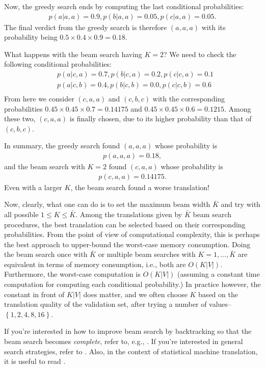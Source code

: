 \documentclass{report}
\begin{document}
Now, the greedy search ends by computing the last conditional probabilities:
\begin{align*}
    p(a|a,a) = 0.9, p(b|a,a) = 0.05, p(c|a,a) = 0.05.
\end{align*}
The final verdict from the greedy search is therefore $(a,a,a)$ with its
probability being $0.5 \times 0.4 \times 0.9 = 0.18$.

What happens with the beam search having $K=2$? We need to check the following
conditional probabilities:
\begin{align*}
    &p(a|c,a) = 0.7, p(b|c,a) = 0.2, p(c|c,a) =0.1 \\
    &p(a|c,b) = 0.4, p(b|c,b) = 0.0, p(c|c,b) =0.6 \\
\end{align*}
From here we consider $(c,a,a)$ and $(c,b,c)$ with the corresponding
probabilities $0.45 \times 0.45 \times 0.7=0.14175$ and $0.45 \times 0.45 \times
0.6 = 0.1215$. Among these two, $(c,a,a)$ is finally chosen, due to its higher
probability than that of $(c,b,c)$.

In summary, the greedy search found $(a,a,a)$ whose probability is
\begin{align*}
    p(a,a,a) = 0.18,
\end{align*}
and the beam search with $K=2$ found $(c,a,a)$ whose probability is
\begin{align*}
    p(c,a,a) = 0.14175.
\end{align*}
Even with a larger $K$, the beam search found a worse translation!

Now, clearly, what one can do is to set the maximum beam width $\bar{K}$ and try
with all possible $1 \leq K \leq \bar{K}$. Among the translations given by
$\bar{K}$ beam search procedures, the best translation can be selected based on
their corresponding probabilities. From the point of view of computational
complexity, this is perhaps the best approach to upper-bound the worst-case
memory consumption. Doing the beam search once with $\bar{K}$ or multiple beam
searches with $K=1,\ldots,\bar{K}$ are equivalent in terms of memory
consumption, i.e., both are $O(K|V|)$. Furthermore, the worst-case computation
is $O(K|V|)$ (assuming a constant time computation for computing each
conditional probability.) In practice however, the constant in front of $K|V|$
does matter, and we often choose $K$ based on the translation quality of the
validation set, after trying a number of values--$\left\{ 1, 2, 4, 8, 16
\right\}$.

If you're interested in how to improve beam search by backtracking so that the
beam search becomes {\em complete}, refer to, e.g.,
\cite{furcy2005limited,zhou2005beam}. If you're interested in general search
strategies, refer to \cite{russell1995artificial}.  Also, in the context of
statistical machine translation, it is useful to read \cite{koehn2004pharaoh}.
\end{document}
